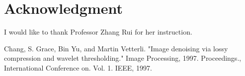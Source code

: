 \documentclass[journal,comsoc]{IEEEtran}
\begin{document}
\section*{Acknowledgment}
I would like to thank Professor Zhang Rui for her instruction.

\begin{thebibliography}{1}
  Chang, S. Grace, Bin Yu, and Martin Vetterli. "Image denoising via lossy compression and wavelet thresholding."
  Image Processing, 1997. Proceedings., International Conference on. Vol. 1. IEEE, 1997.

\end{thebibliography}



\vfill
\end{document}
